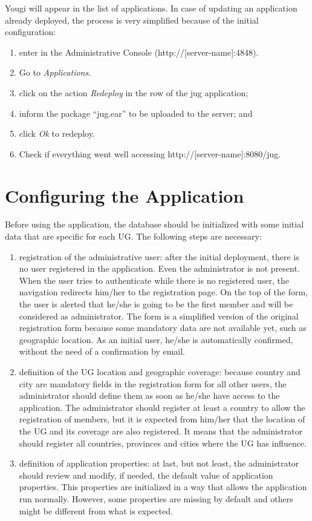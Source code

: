 \documentclass[envcountsame,envcountchap]{svmono}
\begin{document}
Yougi will appear in the list of applications. In case of updating an application already deployed, the process is very simplified because of the initial configuration:

\begin{enumerate}
\item enter in the Administrative Console (http://[server-name]:4848).
\item Go to \textit{Applications}.
\item click on the action \textit{Redeploy} in the row of the jug application;
\item inform the package “jug.ear” to be uploaded to the server; and
\item click \textit{Ok} to redeploy.
\item Check if everything went well accessing http://[server-name]:8080/jug.
\end{enumerate}

\section{Configuring the Application}

Before using the application, the database should be initialized with some initial data that are specific for each UG. The following steps are necessary:

\begin{enumerate}
\item registration of the administrative user: after the initial deployment, there is no user registered in the application. Even the administrator is not present. When the user tries to authenticate while there is no registered user, the navigation redirects him/her to the registration page. On the top of the form, the user is alerted that he/she is going to be the first member and will be considered as administrator. The form is a simplified version of the original registration form because some mandatory data are not available yet, such as geographic location. As an initial user, he/she is automatically confirmed, without the need of a confirmation by email.
\item definition of the UG location and geographic coverage: because country and city are mandatory fields in the registration form for all other users, the administrator should define them as soon as he/she have access to the application. The administrator should register at least a country to allow the registration of members, but it is expected from him/her that the location of the UG and its coverage are also registered. It means that the administrator should register all countries, provinces and cities where the UG has influence.
\item definition of application properties: at last, but not least, the administrator should review and modify, if needed, the default value of application properties. This properties are initialized in a way that allows the application run normally. However, some properties are missing by default and others might be different from what is expected.
\end{enumerate}
\end{document}
